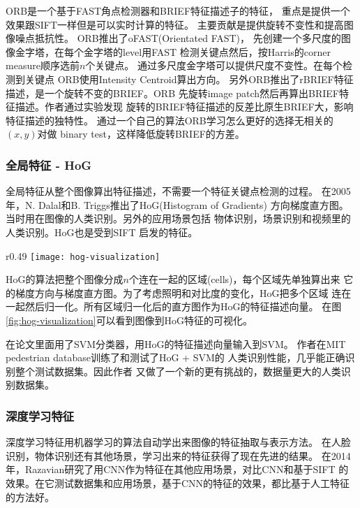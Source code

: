 ORB是一个基于FAST角点检测器和BRIEF特征描述子的特征，
重点是提供一个效果跟SIFT一样但是可以实时计算的特征。
主要贡献是提供旋转不变性和提高图像噪点抵抗性。
ORB推出了oFAST(Orientated FAST)，
先创建一个多尺度的图像金字塔，在每个金字塔的level用FAST
检测关键点然后，按Harris的corner measure顺序选前$n$个关键点。
通过多尺度金字塔可以提供尺度不变性。在每个检测到关键点
ORB使用Intensity Centroid算出方向。
另外ORB推出了rBRIEF特征描述，是一个旋转不变的BRIEF。ORB
先旋转image patch然后再算出BRIEF特征描述。作者通过实验发现
旋转的BRIEF特征描述的反差比原生BRIEF大，影响特征描述的独特性。
通过一个自己的算法ORB学习怎么更好的选择无相关的$(x, y)$对做
binary test，这样降低旋转BRIEF的方差。


\subsubsection{全局特征 - HoG}
全局特征从整个图像算出特征描述，不需要一个特征关键点检测的过程。
在2005年，N. Dalal和B. Triggs推出了HoG(Histogram of Gradients)
方向梯度直方图。\cite{dalal2005histograms}
当时用在图像的人类识别。另外的应用场景包括
物体识别，场景识别和视频里的人类识别。HoG也是受到SIFT
启发的特征。

\begin{wrapfigure}{r}{0.49\textwidth}
  \centering
    \captionsetup{justification=centering}
    \texttt{[image: hog-visualization]}
    \caption{可视化HOG的特征描述。\\
             源：Cornell CS4670}
  \label{fig:hog-visualization}
\end{wrapfigure}
HoG的算法把整个图像分成$n$个连在一起的区域(cells)，每个区域先单独算出来
它的梯度方向与梯度直方图。为了考虑照明和对比度的变化，HoG把多个区域
连在一起然后归一化。所有区域归一化后的直方图作为HoG的特征描述向量。
在图\ref{fig:hog-visualization}可以看到图像到HoG特征的可视化。

在论文里面用了SVM分类器，用HoG的特征描述向量输入到SVM。
作者在MIT pedestrian database训练了和测试了HoG + SVM的
人类识别性能，几乎能正确识别整个测试数据集。因此作者
又做了一个新的更有挑战的，数据量更大的人类识别数据集。


\subsubsection{深度学习特征}
深度学习特征用机器学习的算法自动学出来图像的特征抽取与表示方法。
在人脸识别，物体识别还有其他场景，学习出来的特征获得了现在先进的结果。
\cite{taigman2014deepface, krizhevsky2012imagenet}
在2014年，Razavian研究了用CNN作为特征在其他应用场景，对比CNN和基于SIFT
的效果。在它测试数据集和应用场景，基于CNN的特征的效果，都比基于人工特征的方法好。
\cite{razavian2014cnn}

